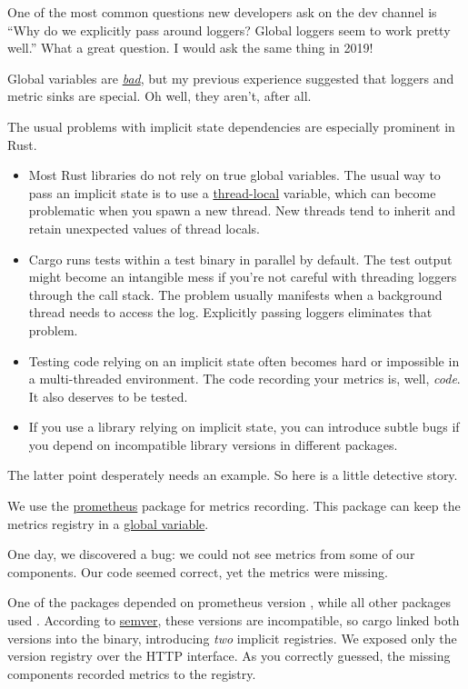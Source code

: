 \documentclass{article}
\begin{document}
One of the most common questions new developers ask on the dev channel is ``Why do we explicitly pass around loggers? Global loggers seem to work pretty well.''
What a great question.
I would ask the same thing in 2019!

Global variables are \href{http://wiki.c2.com/?GlobalVariablesAreBad}{\emph{bad}}, but my previous experience suggested that loggers and metric sinks are special.
Oh well, they aren't, after all.

The usual problems with implicit state dependencies are especially prominent in Rust.
\begin{itemize}
\item
  Most Rust libraries do not rely on true global variables.
  The usual way to pass an implicit state is to use a \href{https://doc.rust-lang.org/stable/std/macro.thread_local.html}{thread-local} variable, which can become problematic when you spawn a new thread.
  New threads tend to inherit and retain unexpected values of thread locals.
\item
  Cargo runs tests within a test binary in parallel by default.
  The test output might become an intangible mess if you’re not careful with threading loggers through the call stack.
  The problem usually manifests when a background thread needs to access the log.
  Explicitly passing loggers eliminates that problem.
\item
  Testing code relying on an implicit state often becomes hard or impossible in a multi-threaded environment.
  The code recording your metrics is, well, \emph{code}.
  It also deserves to be tested.
\item
  If you use a library relying on implicit state, you can introduce subtle bugs if you depend on incompatible library versions in different packages.
\end{itemize}

The latter point desperately needs an example.
So here is a little detective story.

We use the \href{https://crates.io/crates/prometheus}{prometheus} package for metrics recording.
This package can keep the metrics registry in a \href{https://docs.rs/prometheus/0.10.0/src/prometheus/registry.rs.html#307-317}{global variable}.

One day, we discovered a bug: we could not see metrics from some of our components.
Our code seemed correct, yet the metrics were missing.

One of the packages depended on prometheus version , while all other packages used .
According to \href{https://semver.org/}{semver}, these versions are incompatible, so cargo linked both versions into the binary, introducing \emph{two} implicit registries.
We exposed only the  version registry over the HTTP interface.
As you correctly guessed, the missing components recorded metrics to the  registry.
\end{document}
